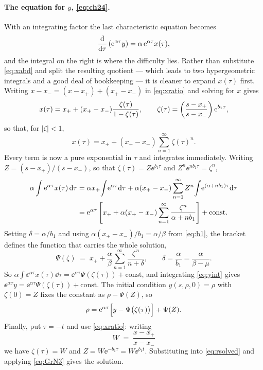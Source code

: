 \paragraph{The equation for $y$, \cref{eq:ch24}.}
With an integrating factor the last characteristic equation becomes
\begin{equation}
\label{eq:yint}
\displaystyle\frac{{\rm d} }{{\rm d} \tau}\left({\rm e}^{\alpha\tau}y\right) = \alpha\,{\rm e}^{\alpha\tau}x(\tau),
\end{equation}
and the integral on the right is where the difficulty lies. Rather than substitute
\cref{eq:xabd} and split the resulting quotient --- which leads to two hypergeometric
integrals and a good deal of bookkeeping --- it is cleaner to expand $x(\tau)$ first.
Writing $x-x_- = (x-x_+)+(x_+-x_-)$ in \cref{eq:xratio} and solving for $x$ gives
\begin{equation}
\label{eq:xgeom}
x(\tau) = x_+ + (x_+-x_-)\frac{\zeta(\tau)}{1-\zeta(\tau)},
\qquad
\zeta(\tau) = \left(\frac{s-x_+}{s-x_-}\right){\rm e}^{b_1\tau},
\end{equation}
so that, for $|\zeta|<1$,
\begin{equation*}
x(\tau) = x_+ + (x_+-x_-)\sum_{n=1}^{\infty}\zeta(\tau)^n .
\end{equation*}
Every term is now a pure exponential in $\tau$ and integrates immediately. Writing
$Z = (s-x_+)/(s-x_-)$, so that $\zeta(\tau) = Z\ee^{b_1\tau}$ and
$Z^n\ee^{nb_1\tau} = \zeta^n$,
\begin{align*}
\alpha\int{\rm e}^{\alpha\tau}x(\tau)\,{\rm d}\tau
&= \alpha x_+\!\int\!{\rm e}^{\alpha\tau}{\rm d}\tau
 + \alpha(x_+-x_-)\sum_{n=1}^{\infty}Z^n\!\int\!{\rm e}^{(\alpha+nb_1)\tau}{\rm d}\tau\\
&= {\rm e}^{\alpha\tau}\left[ x_+ + \alpha(x_+-x_-)\sum_{n=1}^{\infty}\frac{\zeta^n}{\alpha+nb_1}\right]
 + \text{const}.
\end{align*}
Setting $\delta = \alpha/b_1$ and using $\alpha(x_+-x_-)/b_1 = \alpha/\beta$ from
\cref{eq:b1}, the bracket defines the function that carries the whole solution,
\begin{equation}
\label{eq:Psidef}
\Psi(\zeta) \;=\; x_+ + \frac{\alpha}{\beta}\sum_{n=1}^{\infty}\frac{\zeta^{\,n}}{n+\delta},
\qquad \delta = \frac{\alpha}{b_1} = \frac{\alpha}{\beta-\mu} .
\end{equation}
So $\alpha\int\ee^{\alpha\tau}x(\tau)\dd\tau = \ee^{\alpha\tau}\Psi(\zeta(\tau))+\text{const}$,
and integrating \cref{eq:yint} gives
$\ee^{\alpha\tau}y = \ee^{\alpha\tau}\Psi(\zeta(\tau)) + \text{const}$. The initial
condition $y(s,\rho,0)=\rho$ with $\zeta(0)=Z$ fixes the constant as $\rho-\Psi(Z)$, so
\begin{equation}
\label{eq:rsolved}
\rho = {\rm e}^{\alpha\tau}\Bigl[y-\Psi\bigl(\zeta(\tau)\bigr)\Bigr] + \Psi(Z).
\end{equation}
Finally, put $\tau=-t$ and use \cref{eq:xratio}: writing
\begin{equation*}
W \;=\; \frac{x-x_+}{x-x_-}
\end{equation*}
we have $\zeta(\tau)=W$ and $Z = W\ee^{-b_1\tau} = W\ee^{b_1t}$. Substituting into
\cref{eq:rsolved} and applying \cref{eq:GrN3} gives the solution.

